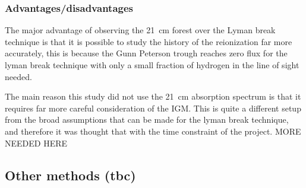         \subsubsection{Advantages/disadvantages} %
    	\label{subsub:Advantages_disadvantages_21cm}
            The major advantage of observing the \SI{21}{\centi\metre} forest over the Lyman break technique is that it is possible to study the history of the reionization far more accurately, this is because the Gunn Peterson trough reaches zero flux for the lyman break technique with only a small fraction of hydrogen in the line of sight needed. 

            The main reason this study did not use the \SI{21}{\centi\metre} absorption spectrum is that it requires far more careful consideration of the IGM.  This is quite a different setup from the broad assumptions that can be made for the lyman break technique, and therefore it was thought that with the time constraint of the project. MORE NEEDED HERE

    
    \subsection{Other methods (tbc)} %
    \label{sub:Other_Methods_Reionization}


